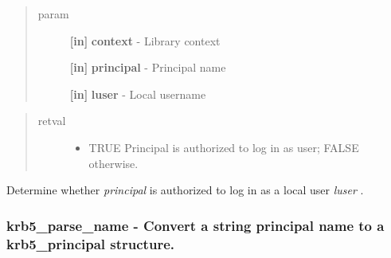 \documentclass[letterpaper,10pt,english]{sphinxmanual}
\begin{document}
\begin{quote}\begin{description}
\item[{param}] \leavevmode
\textbf{{[}in{]}} \textbf{context} - Library context

\textbf{{[}in{]}} \textbf{principal} - Principal name

\textbf{{[}in{]}} \textbf{luser} - Local username

\end{description}\end{quote}
\begin{quote}\begin{description}
\item[{retval}] \leavevmode\begin{itemize}
\item {} 
TRUE   Principal is authorized to log in as user; FALSE otherwise.

\end{itemize}

\end{description}\end{quote}

Determine whether \emph{principal} is authorized to log in as a local user \emph{luser} .


\subsubsection{krb5\_parse\_name -  Convert a string principal name to a krb5\_principal structure.}
\label{appdev/refs/api/krb5_parse_name::doc}\label{appdev/refs/api/krb5_parse_name:krb5-parse-name-convert-a-string-principal-name-to-a-krb5-principal-structure}

\begin{fulllineitems}
\label{appdev/refs/api/krb5_parse_name:krb5_parse_name}
\end{fulllineitems}
\end{document}

